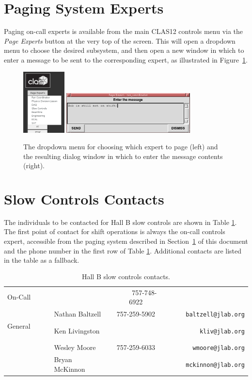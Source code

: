 \documentclass[amsmath,amssymb,notitlepage,11pt]{revtex4}
\begin{document}
\section{Paging System Experts}\label{sec:pagingexperts}
Paging on-call experts is available from the main CLAS12 controls menu via the {\em Page Experts} button at the very top of the screen.  This will open a dropdown menu to choose the desired subsystem, and then open a new window in which to enter a message to be sent to the corresponding expert, as illustrated in Figure~\ref{fig:pageexpert}.
\begin{figure}[htbp]\centering
  \includegraphics[width=0.2\textwidth]{pics/pageexpert}
  \includegraphics[width=0.6\textwidth]{pics/pageexpertmsg}
  \caption{The dropdown menu for choosing which expert to page (left) and the resulting dialog window in which to enter the message contents (right).\label{fig:pageexpert}}
\end{figure}

\newpage
\section{Slow Controls Contacts}
The individuals to be contacted for Hall B slow controls are shown in Table \ref{tab:experts}.  The first point of contact for shift operations is always the on-call controls expert, accessible from the paging system described in Section~\ref{sec:pagingexperts} of this document and the phone number in the first row of Table \ref{tab:experts}.  Additional contacts are listed in the table as a fallback.

\begin{table}[htbp]\centering
    \begin{tabular}{llcr}\toprule[1.5pt]
        On-Call & & \ \ \ \ \ 757-748-6922 & \\ \cmidrule[0.5pt]{1-4}
         & Nathan Baltzell & 757-259-5902 & \ \ \ \ \ \texttt{baltzell@jlab.org} \\
         General \ \ \ \ \       & Ken Livingston  &           & \texttt{kliv@jlab.org} \\
                & Wesley Moore & 757-259-6033 &  \texttt{wmoore@jlab.org} \\
                & Bryan McKinnon & & \texttt{mckinnon@jlab.org} \\
        \bottomrule[1.5pt]
    \end{tabular}
    \caption{Hall B slow controls contacts.\label{tab:experts}}
\end{table}
\end{document}
